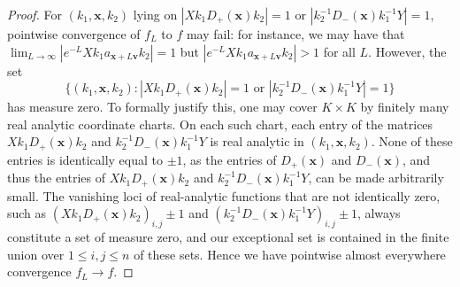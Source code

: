 \documentclass[10pt,a4paper]{amsart}
\newcommand{\x}{\mathbf{x}}
\begin{document}
\begin{proof}
    For $(k_1,\mathbf{x},k_2)$ lying on $| X k_1 D_+(\mathbf{x}) k_2|=1$ or $|  k_2^{-1} D_-(\mathbf{x}) k_1^{-1} Y |=1$, pointwise convergence 
    of $f_L$ to $f$ 
    may fail: for instance, we may have
    that $\lim_{L \to \infty} | e^{-L} X k_1 a_{\mathbf{x}+L\mathbf{v}} k_2 | =1$ but $| e^{-L} X k_1 a_{\mathbf{x}+L\mathbf{v}} k_2 | > 1 $ for all $L$.
However, the set         \[
       \{(k_1,\x,k_2) :
        | X k_1 D_+(\mathbf{x}) k_2| = 1
        \text{ or }
        |  k_2^{-1} D_-(\mathbf{x}) k_1^{-1} Y | =1
        \}
        \]
        has measure zero.
       To formally justify this, one may cover $K \times K$ by finitely many real 
       analytic coordinate charts. On
each such chart, each entry of the matrices
$Xk_1D_+(\mathbf{x})k_2$ and $k_2^{-1}D_-(\mathbf{x})k_1^{-1}Y$ is real
analytic in $(k_1,\mathbf x,k_2)$. None of these entries is identically equal
to $\pm 1$, as the entries of $D_+(\mathbf x)$ and
$D_-(\mathbf x)$, and thus the entries of $Xk_1D_+(\mathbf{x})k_2$ and $k_2^{-1}D_-(\mathbf{x})k_1^{-1}Y$, can be made arbitrarily small. The vanishing loci of real-analytic functions that are not identically zero, such as $(X k_1 D_+(\mathbf{x}) k_2)_{i,j}\pm1$ and $(k_2^{-1} D_-(\mathbf{x}) k_1^{-1} Y)_{i,j}\pm1$, always constitute a set of measure zero, and our exceptional set is contained in the finite union over $1 \le i,j \le n$ of these sets.
Hence we have pointwise almost everywhere convergence 
$f_L \to f$.


\end{proof}
\end{document}
